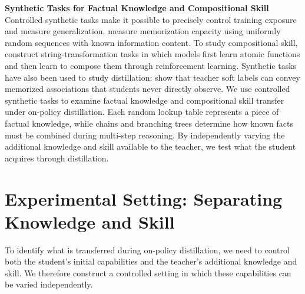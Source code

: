 \documentclass[]{template}
\theoremstyle{plain}
\theoremstyle{definition}
\theoremstyle{remark}
\renewcommand{\paragraph}[1]{\vspace{1mm}\noindent\textbf{#1}}
\begin{document}
\paragraph{Synthetic Tasks for Factual Knowledge and Compositional Skill}
Controlled synthetic tasks make it possible to precisely control training exposure and measure generalization. \citet{morris2026how} measure memorization capacity using uniformly random sequences with known information content. To study compositional skill, \citet{yuan2026f} construct string-transformation tasks in which models first learn atomic functions and then learn to compose them through reinforcement learning. Synthetic tasks have also been used to study distillation: \citet{behrens2026dataset} show that teacher soft labels can convey memorized associations that students never directly observe. We use controlled synthetic tasks to examine factual knowledge and compositional skill transfer under on-policy distillation. Each random lookup table represents a piece of factual knowledge, while chains and branching trees determine how known facts must be combined during multi-step reasoning. By independently varying the additional knowledge and skill available to the teacher, we test what the student acquires through distillation.


\section{Experimental Setting: Separating Knowledge and Skill}
To identify what is transferred during on-policy distillation, we need to control both the student’s initial capabilities and the teacher’s additional knowledge and skill. We therefore construct a controlled setting in which these capabilities can be varied independently.
\end{document}
